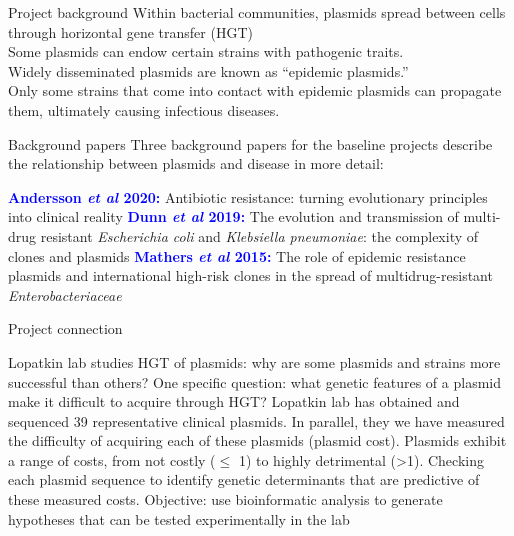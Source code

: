 \documentclass{beamer}
\newcommand{\blu}[1]{\textcolor{blue}{\textbf{#1}}}
\begin{document}
\begin{frame}{Project background}
    Within  bacterial communities, plasmids spread between cells through horizontal gene transfer (HGT)\\
    \bigskip 
    Some plasmids can endow certain strains with pathogenic traits.\\
    \bigskip
    Widely disseminated plasmids are known as ``epidemic plasmids.''\\
    \bigskip
    Only some strains that come into contact with epidemic plasmids can propagate them, ultimately causing infectious diseases.
\end{frame}

\begin{frame}{Background papers}
    Three background papers for the baseline projects describe the relationship between plasmids and disease in more detail:
    \begin{outline}
        \1 \blu{Andersson \textit{et al} 2020: } Antibiotic resistance: turning evolutionary principles into clinical reality
        \1 \blu{Dunn \textit{et al} 2019: } The evolution and transmission of multi-drug resistant \textit{Escherichia coli} and \textit{Klebsiella pneumoniae}: the complexity of clones and plasmids
        \1 \blu{Mathers \textit{et al} 2015: } The role of epidemic resistance plasmids and international high-risk clones in the spread of multidrug-resistant \textit{Enterobacteriaceae}
    \end{outline}
\end{frame}

\begin{frame}{Project connection}
    \begin{outline}
        \1 Lopatkin lab studies HGT of plasmids: why are some plasmids and strains more successful than others?
        \1 One specific question: what genetic features of a plasmid make it difficult to acquire through HGT?
            \2 Lopatkin lab has obtained and sequenced 39 representative clinical plasmids.
            \2 In parallel, they we have measured the difficulty of acquiring each of these plasmids (plasmid cost). 
            \2 Plasmids exhibit a range of costs, from not costly ($\leq$ 1) to highly detrimental (>1).
            \2 Checking each plasmid sequence to identify genetic determinants that are predictive of these measured costs. 
        \1 Objective: use bioinformatic analysis to generate hypotheses that can be tested experimentally in the lab
    \end{outline}
\end{frame}
\end{document}
